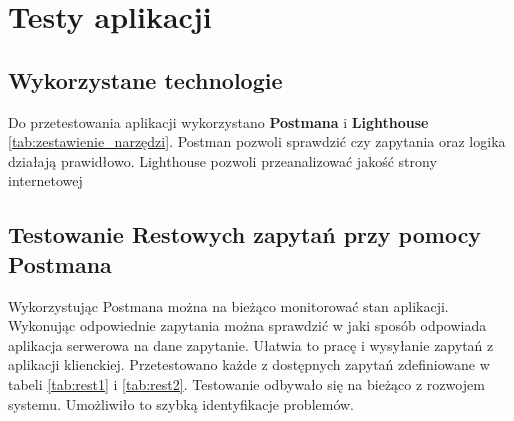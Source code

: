 \chapter{Testy aplikacji}

\section{Wykorzystane technologie}

Do przetestowania aplikacji wykorzystano \textbf{Postmana} i \textbf{Lighthouse} \ref{tab:zestawienie_narzędzi}. Postman pozwoli sprawdzić czy zapytania oraz logika działają prawidłowo. Lighthouse pozwoli przeanalizować jakość strony internetowej


\section{Testowanie Restowych zapytań przy pomocy Postmana}

Wykorzystując Postmana można na bieżąco monitorować stan aplikacji. Wykonując odpowiednie zapytania można sprawdzić w jaki sposób odpowiada aplikacja serwerowa na dane zapytanie. Ułatwia to pracę i wysyłanie zapytań z aplikacji klienckiej. Przetestowano każde z dostępnych zapytań zdefiniowane w tabeli \ref{tab:rest1} i \ref{tab:rest2}. Testowanie odbywało się na bieżąco z rozwojem systemu. Umożliwiło to szybką identyfikacje problemów.

